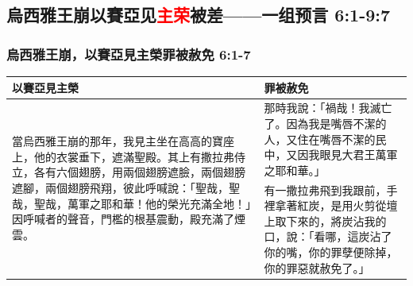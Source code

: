 
\subsection{烏西雅王崩以賽亞见\textcolor{red}{主荣}被差——一组预言 6:1-9:7}
\subsubsection{烏西雅王崩，以賽亞見主榮罪被赦免 6:1-7}
\begin{table}[H]
\centering 
\begin{tabular}{p{8.95cm}|p{8.85cm}}\hline\hline
以賽亞見主榮&罪被赦免\\\hline
\multirow{4}{8.981cm}{當烏西雅王崩的那年，我見主坐在高高的寶座上，他的衣裳垂下，遮滿聖殿。其上有撒拉弗侍立，各有六個翅膀，用兩個翅膀遮臉，兩個翅膀遮腳，兩個翅膀飛翔，彼此呼喊說：「聖哉，聖哉，聖哉，萬軍之耶和華！他的榮光充滿全地！」因呼喊者的聲音，門檻的根基震動，殿充滿了煙雲。} 
&那時我說：「禍哉！我滅亡了。因為我是嘴唇不潔的人，又住在嘴唇不潔的民中，又因我眼見大君王萬軍之耶和華。」\\\cline{2-2}
&有一撒拉弗飛到我跟前，手裡拿著紅炭，是用火剪從壇上取下來的，將炭沾我的口，說：「看哪，這炭沾了你的嘴，你的罪孽便除掉，你的罪惡就赦免了。」 \\\hline
\end{tabular}
\end{table}


